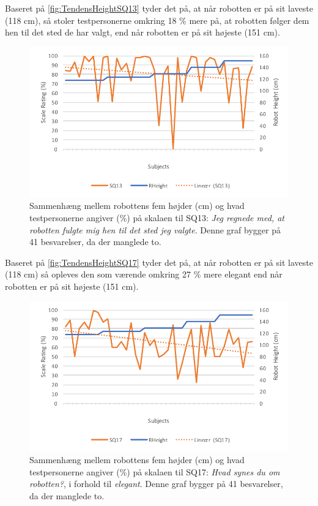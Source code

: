 \noindent
Baseret på \autoref{fig:TendensHeightSQ13} tyder det på, at når robotten er på sit laveste (118 cm), så stoler testpersonerne omkring 18 \% mere på, at robotten følger dem hen til det sted de har valgt, end når robotten er på sit højeste (151 cm). 
%
\begin{figure}[H]
\centering
\includegraphics[width=\textwidth]{Figure/DatabehandlingSkalaer/TendensHeight/HeightSQ13}
\caption{Sammenhæng mellem robottens fem højder (cm) og hvad testpersonerne angiver (\%) på skalaen til SQ13: \textit{Jeg regnede med, at robotten fulgte mig hen til det sted jeg valgte}. Denne graf bygger på 41 besvarelser, da der manglede to.}
\label{fig:TendensHeightSQ13}
\end{figure}
\noindent
% 
Baseret på \autoref{fig:TendensHeightSQ17} tyder det på, at når robotten er på sit laveste (118 cm) så opleves den som værende omkring 27 \% mere elegant end når robotten er på sit højeste (151 cm).
%
\begin{figure}[H]
\centering
\includegraphics[width=\textwidth]{Figure/DatabehandlingSkalaer/TendensHeight/HeightSQ17}
\caption{Sammenhæng mellem robottens fem højder (cm) og hvad testpersonerne angiver (\%) på skalaen til SQ17: \textit{Hvad synes du om robotten?}, i forhold til \textit{elegant}. Denne graf bygger på 41 besvarelser, da der manglede to.}
\label{fig:TendensHeightSQ17}
\end{figure}

